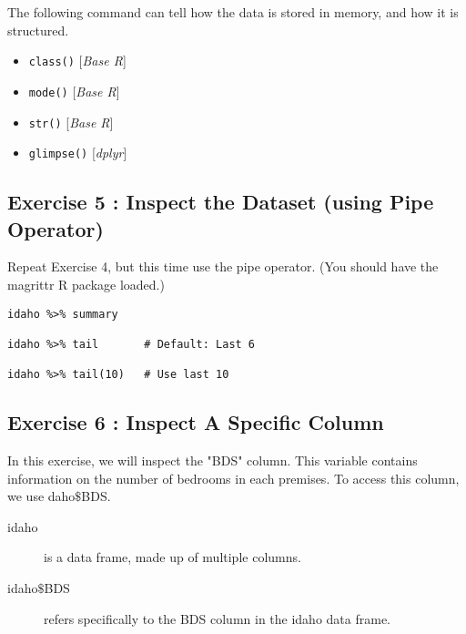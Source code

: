 \documentclass{article}
\begin{document}
The following command can tell how the data is stored in memory, and how it is structured.

\begin{multicols}{2}
\begin{itemize}
\item \texttt{class()} [\textit{Base R}]
\item \texttt{mode()}  [\textit{Base R}]
\item \texttt{str()}   [\textit{Base R}]
\item \texttt{glimpse()} [\textit{dplyr}]
\end{itemize}
\end{multicols}


\subsection*{Exercise 5 : Inspect the Dataset (using Pipe Operator)}

Repeat Exercise 4, but this time use the pipe operator.
(You should have the magrittr R package loaded.)

\begin{framed}
\begin{verbatim}
idaho %>% summary

idaho %>% tail       # Default: Last 6

idaho %>% tail(10)   # Use last 10
\end{verbatim}
\end{framed}


\subsection*{Exercise 6 : Inspect A Specific Column}

In this exercise, we will inspect the "BDS" column. This variable contains information on the number of bedrooms in each premises.
To access this column, we use daho$\$$BDS. 

\begin{framed}
\begin{description}
\item[idaho] is a data frame, made up of multiple columns.
\item[idaho$\$$BDS] refers specifically to the BDS column in the idaho data frame.
\end{description}
\end{framed}
\end{document}
